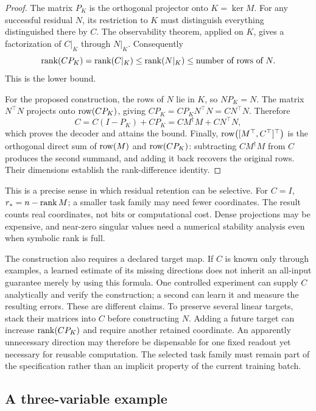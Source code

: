 \begin{proof}
The matrix $P_K$ is the orthogonal projector onto $K=\ker M$.
For any successful residual $N$, its restriction to $K$ must distinguish
everything distinguished there by $C$. The observability theorem, applied on
$K$, gives a factorization of $C|_K$ through $N|_K$. Consequently
\begin{equation*}
  \operatorname{rank}(CP_K)=\operatorname{rank}(C|_K)
  \le\operatorname{rank}(N|_K)\le\text{number of rows of }N.
\end{equation*}
This is the lower bound.

For the proposed construction, the rows of $N$ lie in $K$, so $NP_K=N$.
The matrix $N^\top N$ projects onto $\operatorname{row}(CP_K)$, giving
$CP_K=CP_KN^\top N=CN^\top N$. Therefore
\begin{equation*}
  C=C(I-P_K)+CP_K=CM^\dagger M+CN^\top N,
\end{equation*}
which proves the decoder and attains the bound. Finally,
$\operatorname{row}\bigl([M^\top,C^\top]^\top\bigr)$ is the orthogonal direct sum of
$\operatorname{row}(M)$ and $\operatorname{row}(CP_K)$: subtracting $CM^\dagger M$ from $C$ produces
the second summand, and adding it back recovers the original rows. Their
dimensions establish the rank-difference identity.
\end{proof}

This is a precise sense in which residual retention can be selective.
For $C=I$, $r_*=n-\operatorname{rank} M$; a smaller task family may need fewer coordinates.
The result counts real coordinates, not bits or computational cost. Dense
projections may be expensive, and near-zero singular values need a numerical
stability analysis even when symbolic rank is full.

The construction also requires a declared target map. If $C$ is known only
through examples, a learned estimate of its missing directions does not inherit
an all-input guarantee merely by using this formula. One controlled experiment
can supply $C$ analytically and verify the construction; a second can learn it
and measure the resulting errors. These are different claims. To preserve
several linear targets, stack their matrices into $C$ before constructing $N$.
Adding a future target can increase $\operatorname{rank}(CP_K)$ and require another retained
coordinate. An apparently unnecessary direction may therefore be dispensable
for one fixed readout yet necessary for reusable computation. The selected task
family must remain part of the specification rather than an implicit property
of the current training batch.

\subsection{A three-variable example}
\label{atl:example}

